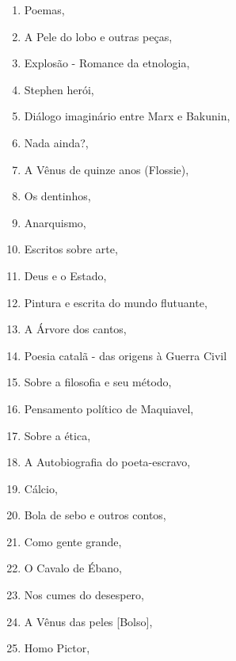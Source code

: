 \begin{multicols}{2}
\begin{enumerate}
\item Poemas, {}
\item A Pele do lobo e outras peças, {}
\item Explosão - Romance da etnologia, {}
\item Stephen herói, {}
\item Diálogo imaginário entre Marx e Bakunin, {}
\item Nada ainda?, {}
\item A Vênus de quinze anos (Flossie), {}
\item Os dentinhos, {}
\item Anarquismo, {}
\item Escritos sobre arte, {}
\item Deus e o Estado, {}
\item Pintura e escrita do mundo flutuante, {}
\item A Árvore dos cantos, {}
\item Poesia catalã - das origens à Guerra Civil
\item Sobre a filosofia e seu método, {}
\item Pensamento político de Maquiavel, {}
\item Sobre a ética, {}
\item A Autobiografia do poeta-escravo, {}
\item Cálcio, {}
\item Bola de sebo e outros contos, {}
\item Como gente grande, {}
\item O Cavalo de Ébano, {}
\item Nos cumes do desespero, {}
\item A Vênus das peles [Bolso], {}
\item Homo Pictor, {}

\end{enumerate}
\end{multicols}
